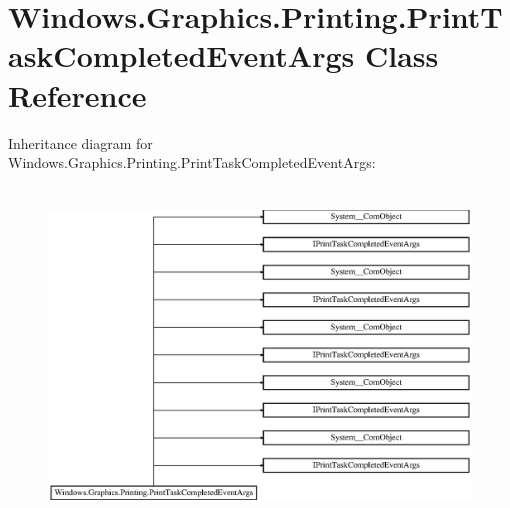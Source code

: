 \hypertarget{class_windows_1_1_graphics_1_1_printing_1_1_print_task_completed_event_args}{}\section{Windows.\+Graphics.\+Printing.\+Print\+Task\+Completed\+Event\+Args Class Reference}
\label{class_windows_1_1_graphics_1_1_printing_1_1_print_task_completed_event_args}
Inheritance diagram for Windows.\+Graphics.\+Printing.\+Print\+Task\+Completed\+Event\+Args\+:\begin{figure}[H]
\begin{center}
\leavevmode
\includegraphics[height=8.901734cm]{class_windows_1_1_graphics_1_1_printing_1_1_print_task_completed_event_args}
\end{center}
\end{figure}
